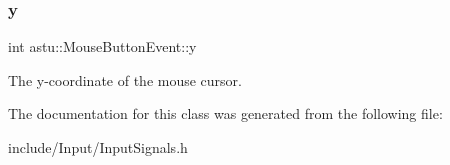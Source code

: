 \subsubsection{\texorpdfstring{y}{y}}
{\footnotesize\ttfamily int astu\+::\+Mouse\+Button\+Event\+::y}

The y-\/coordinate of the mouse cursor. 

The documentation for this class was generated from the following file\+:\begin{DoxyCompactItemize}
\item 
include/\+Input/Input\+Signals.\+h\end{DoxyCompactItemize}
